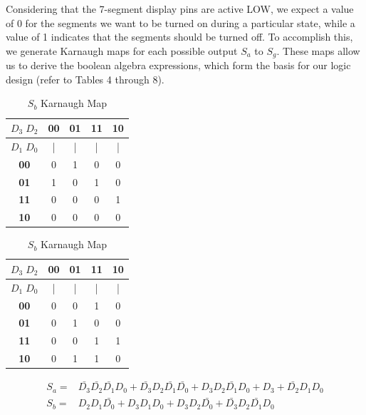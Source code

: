 \documentclass{article}
\begin{document}
Considering that the 7-segment display pins are active LOW, we expect a value of 0 for the segments we want to be turned on during a particular state, while a value of 1 indicates that the segments should be turned off. To accomplish this, we generate Karnaugh maps for each possible output $S_a$ to $S_g$. These maps allow us to derive the boolean algebra expressions, which form the basis for our logic design (refer to Tables 4 through 8).

\begin{table}[H]
  \centering
  \begin{minipage}{0.45\textwidth}
  \centering
  \begin{tabular}{|c|c|c|c|c|}
  \hline
  \textbf{$D_3 \; D_2$} & \textbf{00} & \textbf{01} & \textbf{11} & \textbf{10} \\
  \hline
  \textbf{$D_1 \; D_0$} & | & | & | & | \\
  \hline
  \textbf{00} & 0 & 1 & 0 & 0 \\
  \hline
  \textbf{01} & 1 & 0 & 1 & 0 \\
  \hline
  \textbf{11} & 0 & 0 & 0 & 1 \\
  \hline
  \textbf{10} & 0 & 0 & 0 & 0 \\
  \hline
  \end{tabular}
  \caption{$S_a$ Karnaugh Map}
  \end{minipage}
  \hfill
  \begin{minipage}{0.45\textwidth}
  \centering
  \begin{tabular}{|c|c|c|c|c|}
  \hline
  \textbf{$D_3 \; D_2$} & \textbf{00} & \textbf{01} & \textbf{11} & \textbf{10} \\
  \hline
  \textbf{$D_1 \; D_0$} & | & | & | & | \\
  \hline
  \textbf{00} & 0 & 0 & 1 & 0 \\
  \hline
  \textbf{01} & 0 & 1 & 0 & 0 \\
  \hline
  \textbf{11} & 0 & 0 & 1 & 1 \\
  \hline
  \textbf{10} & 0 & 1 & 1 & 0 \\
  \hline
  \end{tabular}
  \caption{$S_b$ Karnaugh Map}
  \end{minipage}
\end{table}
\begin{align*}
  S_a =& \bar{D_3}\bar{D_2}\bar{D_1}D_0+\bar{D_3}D_2\bar{D_1}\bar{D_0}+D_3D_2\bar{D_1}D_0+D_3+\bar{D_2}D_1D_0\\
  S_b =&D_2D_1\bar{D_0}+D_3D_1D_0+D_3D_2\bar{D_0}+\bar{D_3}D_2\bar{D_1}D_0
\end{align*}
\end{document}
